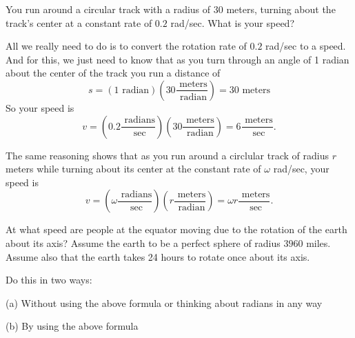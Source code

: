 \documentclass{ximera}
\begin{document}
\begin{question}  \label{Q2675: Angles}
You run around a circular track with a radius of $30$ meters, turning about the track's center at a constant rate of $0.2$ rad/sec. What is your speed?

\begin{explanation}
All we really need to do is to convert the rotation rate of $0.2$ rad/sec to a speed. And for this, we just need to know that 
as you turn through an angle of 1 radian about the center of the track you run a distance of 
\[
     s = (1 \text{ radian}) \left( 30 \frac{\text{ meters}}{\text{ radian}}\right) = 30 \text{ meters}
\]
So your speed is
\[
   v = \left( 0.2 \frac{\text{ radians}}{\text{ sec}}\right) \left( 30 \frac{\text{ meters}}{\text{ radian}}\right) = 6 \frac{\text{ meters}}{\text{ sec}}.
\]

The same reasoning shows that as you run around a circlular track of radius $r$ meters while turning about its center at the constant rate of $\omega$ rad/sec, your speed is
\[
   v = \left( \omega \frac{\text{ radians}}{\text{ sec}}\right) \left( r \frac{\text{ meters}}{\text{ radian}}\right) = \omega r \frac{\text{ meters}}{\text{ sec}}.
\]


\end{explanation}
\end{question}


\begin{question}  \label{Q255: Angles}
At what speed are people at the equator moving due to the rotation of the earth about its axis? Assume the earth to be a perfect sphere of radius $3960$ miles. Assume also that the earth takes 24 hours to rotate once about its axis.

Do this in two ways:

(a) Without using the above formula or thinking about radians in any way

(b) By using the above formula

\end{question}
\end{document}
